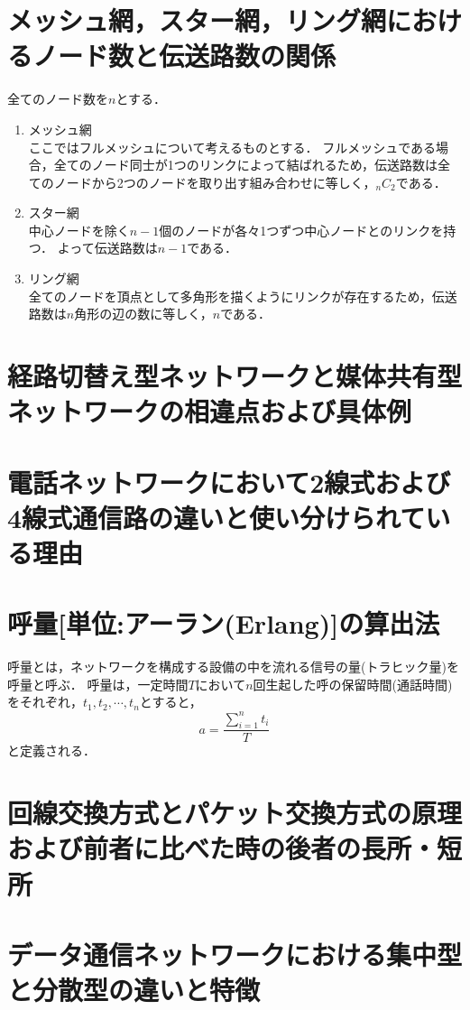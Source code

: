 \documentclass[10.5pt]{jsarticle}
\begin{document}
\section{メッシュ網，スター網，リング網におけるノード数と伝送路数の関係}
全てのノード数を$n$とする．
\begin{enumerate}
\item{メッシュ網}\\
ここではフルメッシュについて考えるものとする．
フルメッシュである場合，全てのノード同士が1つのリンクによって結ばれるため，伝送路数は全てのノードから2つのノードを取り出す組み合わせに等しく，\underline{${}_nC_2$}である．
\item{スター網}\\
中心ノードを除く$n-1$個のノードが各々1つずつ中心ノードとのリンクを持つ．
よって伝送路数は\underline{$n-1$}である．
\item{リング網}\\
全てのノードを頂点として多角形を描くようにリンクが存在するため，伝送路数は$n$角形の辺の数に等しく，\underline{$n$}である．
\end{enumerate}

\section{経路切替え型ネットワークと媒体共有型ネットワークの相違点および具体例}


\section{電話ネットワークにおいて2線式および4線式通信路の違いと使い分けられている理由}


\section{呼量[単位:アーラン(Erlang)]の算出法}
呼量とは，ネットワークを構成する設備の中を流れる信号の量(トラヒック量)を呼量と呼ぶ．
呼量は，一定時間$T$において$n$回生起した呼の保留時間(通話時間)をそれぞれ，$t_1, t_2, \cdots , t_n$とすると，
\[\displaystyle a = \frac{\displaystyle \sum_{i=1}^n t_i}{T}\]
と定義される．

\section{回線交換方式とパケット交換方式の原理および前者に比べた時の後者の長所・短所}


\section{データ通信ネットワークにおける集中型と分散型の違いと特徴}
\end{document}
